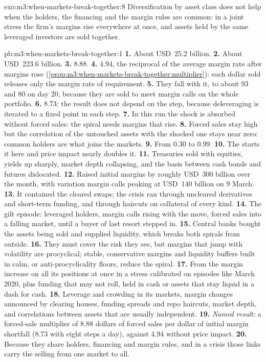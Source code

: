 \begin{solution}{exo:m3:when-markets-break-together:8}
Diversification by asset class does not help when the holders, the financing and the margin rules are common: in a joint stress the firm's margins rise
everywhere at once, and assets held by the same leveraged investors are sold together.
\end{solution}

\begin{solution}{pb:m3:when-markets-break-together:1}
\textbf{1.} About USD~25.2 billion. \textbf{2.} About USD~223.6 billion. \textbf{3.} 8.88. \textbf{4.} 4.94, the reciprocal of the average margin rate
after margins rose (\cref{prop:m3:when-markets-break-together:multiplier}): each dollar sold releases only the margin rate of requirement. \textbf{5.} They
fall with it, to about 93 and 80 on day 20, because they are sold to meet margin calls on the whole portfolio. \textbf{6.} 8.73: the result does not depend
on the step, because deleveraging is iterated to a fixed point in each step. \textbf{7.} In this run the shock is absorbed without forced sales: the spiral
needs margins that rise. \textbf{8.} Forced sales stay high but the correlation of the untouched assets with the shocked one stays near zero: common holders
are what joins the markets. \textbf{9.} From 0.30 to 0.99. \textbf{10.} The  starts it here and price impact nearly doubles it. \textbf{11.}
Treasuries sold with equities, yields up sharply, market depth collapsing, and the basis between cash bonds and futures dislocated. \textbf{12.} Raised
initial margins by roughly USD~300 billion over the month, with variation margin calls peaking at USD~140 billion on 9 March. \textbf{13.} It contained the
cleared swaps; the crisis ran through uncleared derivatives and short-term funding, and through haircuts on collateral of every kind. \textbf{14.} The
gilt episode: leveraged holders, margin calls rising with the move, forced sales into a falling market, until a buyer of last resort stepped in.
\textbf{15.} Central banks bought the assets being sold and supplied liquidity, which breaks both spirals from outside. \textbf{16.} They must cover the risk
they see, but margins that jump with volatility are procyclical; stable, conservative margins and liquidity buffers built in calm, or anti-procyclicality
floors, reduce the spiral. \textbf{17.} From the margin increase on all its positions at once in a stress calibrated on episodes like March 2020, plus
funding that may not roll, held in cash or assets that stay liquid in a dash for cash. \textbf{18.} Leverage and crowding in its markets, margin changes
announced by clearing houses, funding spreads and repo haircuts, market depth, and correlations between assets that are usually independent.
\textbf{19.} \emph{Named result:} a forced-sale multiplier of 8.88 dollars of forced sales per dollar of initial margin shortfall (8.73 with eight steps a
day), against 4.94 without price impact. \textbf{20.} Because they share holders, financing and margin rules, and in a crisis those links carry the selling
from one market to all.
\end{solution}

